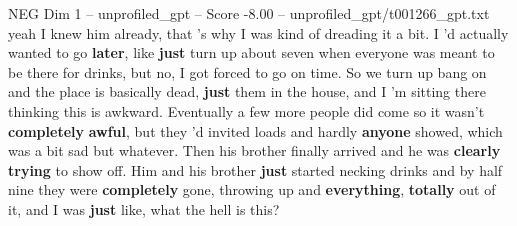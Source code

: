 \begin{textsample}{NEG Dim 1 – unprofiled\_gpt – Score -8.00 – unprofiled\_gpt/t001266\_gpt.txt}  \label{ex:f1_neg_026}
yeah I knew him already, that ’s why I was kind of dreading it a bit.
I ’d actually wanted to go \textbf{later}, like \textbf{just} turn up about seven when everyone was meant to be there for drinks, but no, I got forced to go on time.
So we turn up bang on and the place is basically dead, \textbf{just} them in the house, and I ’m sitting there thinking this is awkward.
Eventually a few more people did come so it wasn't \textbf{completely} \textbf{awful}, but they ’d invited loads and hardly \textbf{anyone} showed, which was a bit sad but whatever.
Then his brother finally arrived and he was \textbf{clearly} \textbf{trying} to show off.
Him and his brother \textbf{just} started necking drinks and by half nine they were \textbf{completely} gone, throwing up and \textbf{everything}, \textbf{totally} out of it, and I was \textbf{just} like, what the hell is this?

\end{textsample}
